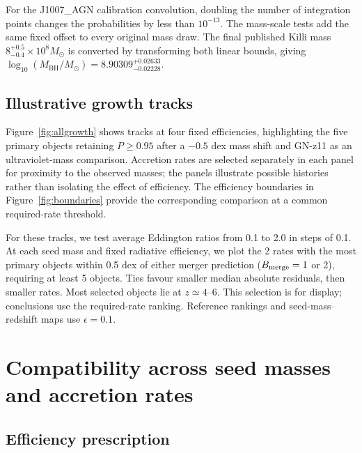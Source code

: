 \documentclass[pdflatex,sn-basic]{sn-jnl}
\newcommand{\mbh}{M_{\mathrm{BH}}}
\begin{document}
For the J1007\_AGN calibration convolution, doubling the number of
integration points changes the probabilities by less than $10^{-13}$.
The mass-scale tests add the same fixed offset to every original mass draw.
The final published Killi mass
$8^{+0.5}_{-0.4}\times10^8M_\odot$ is converted by transforming both linear
bounds, giving $\log_{10}(\mbh/M_\odot)=8.90309^{+0.02633}_{-0.02228}$.

\subsection{Illustrative growth tracks}
\label{app:tracks}

Figure~\ref{fig:allgrowth} shows tracks at four fixed efficiencies,
highlighting the five primary objects retaining $P\geq0.95$ after a
$-0.5$ dex mass shift and GN-z11 as an ultraviolet-mass comparison. Accretion rates
are selected separately in each panel for proximity to the observed masses;
the panels illustrate possible histories rather than isolating the effect
of efficiency. The efficiency boundaries in Figure~\ref{fig:boundaries}
provide the corresponding comparison at a common required-rate threshold.


For these tracks, we test average Eddington ratios from 0.1 to
2.0 in steps of 0.1. At each seed mass and fixed radiative efficiency, we plot
the 2 rates with the most primary objects within 0.5 dex of either merger
prediction ($B_{\rm merge}=1$ or 2), requiring at least 5 objects.
Ties favour smaller median absolute residuals, then smaller rates. Most
selected objects lie at $z\simeq4$--6. This selection is for display;
conclusions use the required-rate ranking. Reference rankings and
seed-mass--redshift maps use $\epsilon=0.1$.

\section{Compatibility across seed masses and accretion rates}
\label{app:compatibility}

\subsection{Efficiency prescription}
\label{app:efficiency}
\end{document}
